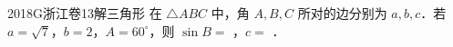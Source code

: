 
\begin{problem}{2018}{G}{浙江卷}{13}{解三角形}
在 $ \triangle ABC $ 中，角 $ A,B,C $ 所对的边分别为 $ a,b,c $．若 $ a=\sqrt{7} $，$ b=2 $，$ A=60^\circ $，则 $ \sin B= $ \underline{\hspace{4em}}，$ c= $ \underline{\hspace{4em}}．
\end{problem}

\begin{answer}

\end{answer}

\begin{solutions}

\end{solutions}